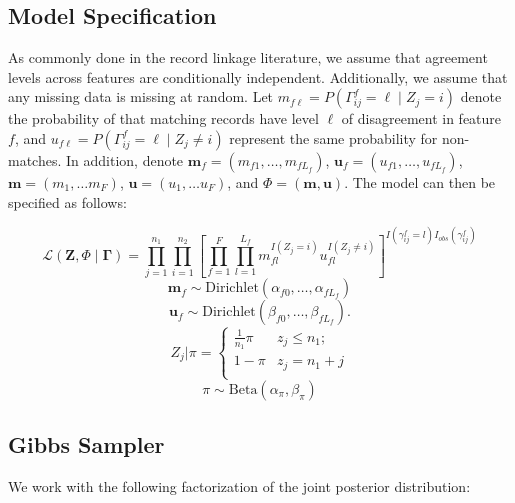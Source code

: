 \documentclass[12pt,letterpaper]{article}
\newcommand{\1}[1]{\mathbb{I}\!\left[#1\right]} %
\begin{document}

\hypertarget{fabl-model}{%
	\subsection{Model Specification}
	\label{model-specification}} 

As commonly done in the record linkage literature, we assume that agreement levels across features are conditionally independent. Additionally, we assume that any missing data is missing at random. Let  $m_{f\ell} = P(\Gamma_{ij}^f = \ell \mid Z_j = i)$ denote the probability of that matching records have level $\ell$ of disagreement in feature $f$, and $u_{f\ell} = P(\Gamma_{ij}^f = \ell \mid Z_j \neq i)$ represent the same probability for non-matches. In addition, denote $\bm{m}_f = (m_{f1}, \ldots, m_{fL_f})$, $\bm{u}_f = (u_{f1}, \ldots, u_{fL_f})$, $\bm{m}= (m_1, \ldots m_F)$, $\bm{u}= (u_1, \ldots u_F)$, and $\Phi = (\bm{m}, \bm{u})$.
The model can then be specified as follows:

$$\mathcal{L}(\bm{Z}, \Phi \mid \bm{\Gamma}) = \prod_{j=1}^{n_1}  \prod_{i=1}^{n_2}\left[ \prod_{f=1}^{F}\prod_{l=1}^{L_f} m_{fl}^{I(Z_j = i)}u_{fl}^{I(Z_j \neq i)}\right]^{I(\gamma_{ij}^f = l)I_{obs}(\gamma_{ij}^f)}$$
$$\bm{m}_f \sim \text{Dirichlet}(\alpha_{f0}, \ldots, \alpha_{f L_f})$$
$$\bm{u}_f \sim \text{Dirichlet}(\beta_{f0}, \ldots, \beta_{f L_f}).$$
$$Z_j | \pi =
\begin{cases} 
	\frac{1}{n_1}\pi  & z_j \leq n_1; \\
	1-\pi &  z_j  = n_1 + j \\
\end{cases}$$
$$\pi \sim \text{Beta}(\alpha_{\pi}, \beta_{\pi})$$

\hypertarget{posterior-sampling}{%
	\subsection{Gibbs Sampler}
	\label{gibbs_sampling}}
We work with the following factorization of the joint posterior distribution:
\end{document}
